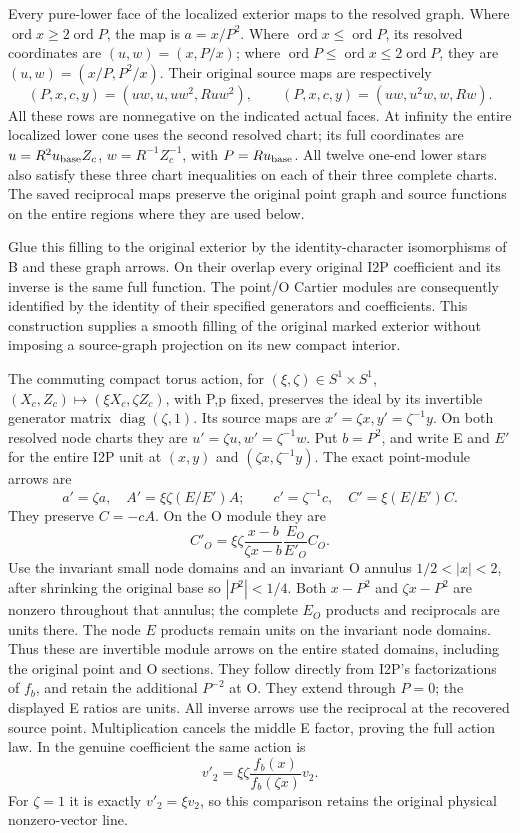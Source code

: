 Every pure-lower face of the localized exterior maps to the resolved
graph.  Where \(\operatorname{ord}x\geq2\operatorname{ord}P\), the
map is \(a=x/P^2\).  Where
\(\operatorname{ord}x\leq\operatorname{ord}P\), its resolved coordinates
are \((u,w)=(x,P/x)\); where
\(\operatorname{ord}P\leq\operatorname{ord}x\leq2\operatorname{ord}P\),
they are \((u,w)=(x/P,P^2/x)\).  Their original source maps are respectively
\[
(P,x,c,y)=(uw,u,uw^2,Ruw^2),\qquad
(P,x,c,y)=(uw,u^2w,w,Rw).
\]
All these rows are nonnegative on the indicated actual faces.  At
infinity the entire localized lower cone uses the second resolved chart;
its full coordinates are \(u=R^2u_{\rm base}Z_c\),
\(w=R^{-1}Z_c^{-1}\), with \(P=Ru_{\rm base}\).  All twelve one-end
lower stars also satisfy these three chart inequalities on each of their
three complete charts.  The saved reciprocal maps preserve the original
point graph and source functions on the entire regions where they are
used below.

Glue this filling to the original exterior by the identity-character
isomorphisms of B and these graph arrows.  On their overlap every original
I2P coefficient and its inverse is the same full function.  The point/O
Cartier modules are consequently identified by the identity of their
specified generators and coefficients.  This construction supplies a
smooth filling of the original marked exterior without imposing a
source-graph projection on its new compact interior.

The commuting compact torus action, for \((\xi,\zeta)\in S^1\times S^1\),
\((X_c,Z_c)\mapsto(\xi X_c,\zeta Z_c)\), with P,p fixed, preserves the
ideal by its invertible generator matrix \(\operatorname{diag}(\zeta,1)\).
Its source maps are \(x'=\zeta x,y'=\zeta^{-1}y\).  On both resolved
node charts they are \(u'=\zeta u,w'=\zeta^{-1}w\).
Put \(b=P^2\), and write E and \(E'\) for the entire I2P unit at
\((x,y)\) and \((\zeta x,\zeta^{-1}y)\).  The exact point-module arrows are
\[
a'=\zeta a,\quad A'=\xi\zeta(E/E')A;\qquad
c'=\zeta^{-1}c,\quad C'=\xi(E/E')C.
\]
They preserve \(C=-cA\).  On the O module they are
\[
C'_O=\xi\zeta\frac{x-b}{\zeta x-b}\frac{E_O}{E'_O}C_O.
\]
Use the invariant small node domains and an invariant O annulus
\(1/2<|x|<2\), after shrinking the original base so \(|P^2|<1/4\).
Both \(x-P^2\) and \(\zeta x-P^2\) are nonzero throughout that annulus;
the complete \(E_O\) products and reciprocals are units there.  The
node \(E\) products remain units on the invariant node domains.
Thus these are invertible module arrows on the entire stated domains,
including the original point and O sections.  They follow directly from
I2P's factorizations of \(f_b\), and retain the additional \(P^{-2}\)
at O.  They extend through \(P=0\); the displayed E ratios are units.
All inverse arrows use the reciprocal at the recovered source point.
Multiplication cancels the middle E factor, proving the full action law.
In the genuine coefficient the same action is
\[
v'_2=\xi\zeta\frac{f_b(x)}{f_b(\zeta x)}v_2.
\]
For \(\zeta=1\) it is exactly \(v'_2=\xi v_2\), so this comparison
retains the original physical nonzero-vector line.

